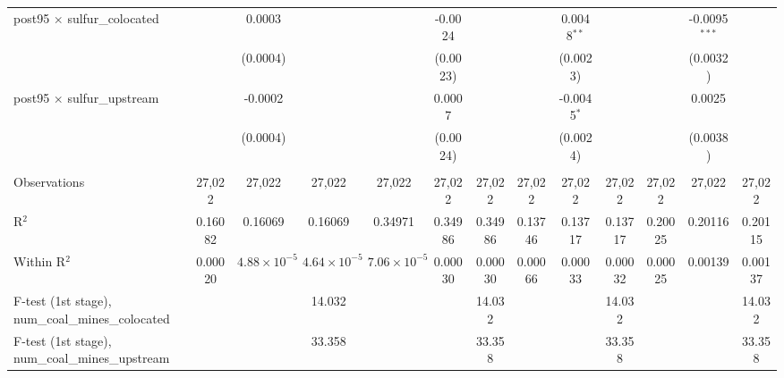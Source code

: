 \begin{table}[htbp]
\begin{adjustbox}{width = \textwidth, center}
\begin{tabular}{lcccccccccccc}
         post95 $\times$ sulfur\_colocated                  &               & 0.0003                &                       &                       & -0.0024       &               &               & 0.0048$^{**}$  &               &               & -0.0095$^{***}$ &   \\   
                                                            &               & (0.0004)              &                       &                       & (0.0023)      &               &               & (0.0023)       &               &               & (0.0032)        &   \\   
         post95 $\times$ sulfur\_upstream                   &               & -0.0002               &                       &                       & 0.0007        &               &               & -0.0045$^{*}$  &               &               & 0.0025          &   \\   
                                                            &               & (0.0004)              &                       &                       & (0.0024)      &               &               & (0.0024)       &               &               & (0.0038)        &   \\   
          \\
         Observations                                       & 27,022        & 27,022                & 27,022                & 27,022                & 27,022        & 27,022        & 27,022        & 27,022         & 27,022        & 27,022        & 27,022          & 27,022\\  
         R$^2$                                              & 0.16082       & 0.16069               & 0.16069               & 0.34971               & 0.34986       & 0.34986       & 0.13746       & 0.13717        & 0.13717       & 0.20025       & 0.20116         & 0.20115\\  
         Within R$^2$                                       & 0.00020       & $4.88\times 10^{-5}$  & $4.64\times 10^{-5}$  & $7.06\times 10^{-5}$  & 0.00030       & 0.00030       & 0.00066       & 0.00033        & 0.00032       & 0.00025       & 0.00139         & 0.00137\\  
         F-test (1st stage), num\_coal\_mines\_colocated    &               &                       & 14.032                &                       &               & 14.032        &               &                & 14.032        &               &                 & 14.032\\  
         F-test (1st stage), num\_coal\_mines\_upstream     &               &                       & 33.358                &                       &               & 33.358        &               &                & 33.358        &               &                 & 33.358\\  

\end{tabular}
\end{adjustbox}
\end{table}
